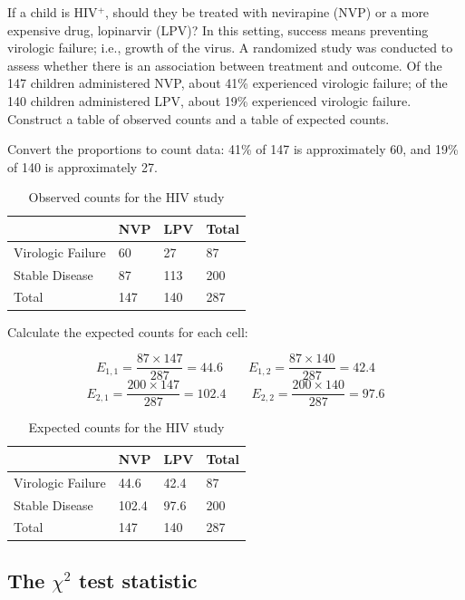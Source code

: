 \begin{example} {If a child is HIV$^+$, should they be treated with nevirapine (NVP) or a more expensive drug, lopinarvir (LPV)? In this setting, success means preventing virologic failure; i.e., growth of the virus. A randomized study was conducted to assess whether there is an association between treatment and outcome. Of the 147 children administered NVP, about 41\% experienced virologic failure; of the 140 children administered LPV, about 19\% experienced virologic failure. Construct a table of observed counts and a table of expected counts.}
	
Convert the proportions to count data: 41\% of 147 is approximately 60, and 19\% of 140 is approximately 27. 

\begin{table}[h]
	\centering
	\begin{tabular}{l | l l | l}
	\hline
	& NVP & LPV & Total \\
	\hline
	Virologic Failure & 60 & 27 & 87 \\
	Stable Disease & 87 & 113 & 200 \\	
	\hline
	Total & 147 & 140 & 287 \\
	\hline
	\end{tabular}
	\caption{Observed counts for the HIV study}
\end{table}

Calculate the expected counts for each cell:

\[E_{1, 1} = \dfrac{87 \times 147}{287} = 44.6 \qquad E_{1, 2} = \dfrac{87 \times 140}{287} = 42.4 \]
\[E_{2, 1} = \dfrac{200 \times 147}{287} = 102.4 \qquad E_{2, 2} = \dfrac{200 \times 140}{287} = 97.6 \]

\begin{table}[h]
	\centering
	\begin{tabular}{l | l l | l}
		\hline
		& NVP & LPV & Total \\
		\hline
		Virologic Failure & 44.6 & 42.4 & 87 \\
		Stable Disease & 102.4 & 97.6 & 200 \\
		\hline	
		Total & 147 & 140 & 287 \\
		\hline
	\end{tabular}
	\caption{Expected counts for the HIV study}
\end{table}

\end{example}

\subsection{The $\chi^2$ test statistic}


